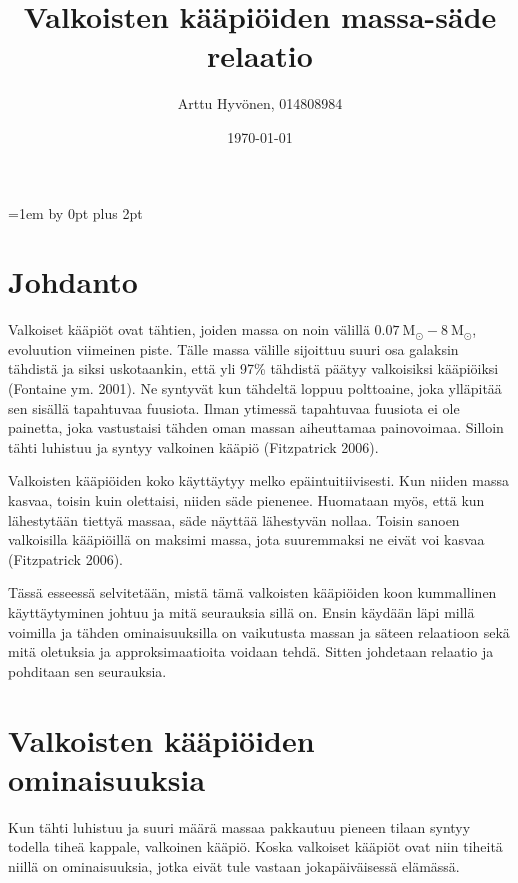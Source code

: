 \documentclass[12pt,a4paper,titlepage]{article}
\title{Valkoisten kääpiöiden massa-säde relaatio}
\author{\begin{tabular}{c}
Arttu Hyv{\"o}nen, 014808984
\end{tabular}}
\date{\today}
\begin{document}
\maketitle
{}

\restoregeometry

\thispagestyle{empty}
\tableofcontents
\newpage
\setcounter{page}{1}
\parskip=1em \advance\parskip by 0pt plus 2pt
\pagestyle{fancy}


\section{Johdanto}

Valkoiset kääpiöt ovat tähtien, joiden massa on noin välillä $0.07\: \mathrm{M_{\odot}} -8\: \mathrm{M_{\odot}}$, evoluution viimeinen piste. Tälle massa välille sijoittuu suuri osa galaksin tähdistä ja siksi uskotaankin, että yli 97\% tähdistä päätyy valkoisiksi kääpiöiksi (Fontaine ym. 2001). Ne syntyvät kun tähdeltä loppuu polttoaine, joka ylläpitää sen sisällä tapahtuvaa fuusiota. Ilman ytimessä tapahtuvaa fuusiota ei ole painetta, joka vastustaisi tähden oman massan aiheuttamaa painovoimaa. Silloin tähti luhistuu ja syntyy valkoinen kääpiö (Fitzpatrick 2006). 

Valkoisten kääpiöiden koko käyttäytyy melko epäintuitiivisesti. Kun niiden massa kasvaa, toisin kuin olettaisi, niiden säde pienenee. Huomataan myös, että kun lähestytään tiettyä massaa, säde näyttää lähestyvän nollaa. Toisin sanoen valkoisilla kääpiöillä on maksimi massa, jota suuremmaksi ne eivät voi kasvaa (Fitzpatrick 2006).

Tässä esseessä selvitetään, mistä tämä valkoisten kääpiöiden koon kummallinen käyttäytyminen johtuu ja mitä seurauksia sillä on. Ensin käydään läpi millä voimilla ja tähden ominaisuuksilla on vaikutusta massan ja säteen relaatioon sekä mitä oletuksia ja approksimaatioita voidaan tehdä. Sitten johdetaan relaatio ja pohditaan sen seurauksia.


\newpage
\section{Valkoisten kääpiöiden ominaisuuksia}

Kun tähti luhistuu ja suuri määrä massaa pakkautuu pieneen tilaan syntyy todella tiheä kappale, valkoinen kääpiö. Koska valkoiset kääpiöt ovat niin tiheitä niillä on ominaisuuksia, jotka eivät tule vastaan jokapäiväisessä elämässä. 
\end{document}

